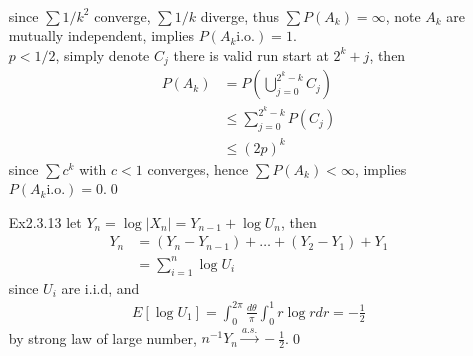 \documentclass[paper=a4, fontsize=11pt]{scrartcl} %
\numberwithin{equation}{section} %
\numberwithin{figure}{section} %
\numberwithin{table}{section} %
\begin{document}
\begin{itemize}
\begin{align}
	\end{align}
	since $\sum 1/k^2$ converge, $\sum 1/k$ diverge, thus $\sum P(A_k)=\infty$, note $A_k$ are mutually independent, implies $P(A_k\text{i.o.})=1$.\\
	$p<1/2$, simply denote $C_j$ there is valid run start at $2^k+j$, then  
	\begin{align}
		P(A_k) &= P(\bigcup_{j=0}^{2^k-k} C_j) \\
			&\leq \sum_{j=0}^{2^k-k} P(C_j) \\
			&\leq (2p)^k
	\end{align}
	since $\sum c^k$ with $c<1$ converges, hence $\sum P(A_k)<\infty$, implies $P(A_k\text{i.o.})=0$.\qed
	\item[Ex2.3.13] let $Y_n = \log |X_n| = Y_{n-1}+ \log U_n$, then 
	\begin{align}
		Y_n &= (Y_n-Y_{n-1})+ \dots + (Y_2-Y_1) +Y_1 \\
			&= \sum_{i=1}^n \log U_i
	\end{align}
	since $U_i$ are i.i.d, and 
	\begin{align}
		E[\log U_1] = \int_0^{2\pi}\frac{d\theta}{\pi} \int_0^1 r\log r dr=-\frac{1}{2}
	\end{align}
	by strong law of large number, $n^{-1}Y_n \stackrel{a.s.}{\rightarrow} -\frac{1}{2}$.\qed
\end{itemize}
\end{document}
